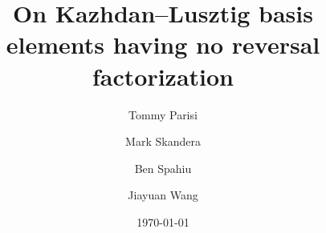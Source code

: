 \documentclass[12pt]{amsart}
\theoremstyle{definition}
\numberwithin{equation}{section}
\newcommand{\wtc}[2]{\widetilde{C}_{#1}}
\newcommand{\msfA}{\mathsf{A}}
\newcommand{\msfBB}{\mathsf{B}}
\newcommand{\msfC}{\mathsf{C}}
\newcommand{\msfBC}{\mathsf{BC}}
\begin{document}
\author{Tommy Parisi}
\author{Mark Skandera}
\author{Ben Spahiu}
\author{Jiayuan Wang}
\title[Kahzdan--Lusztig basis elements having no reversal factorization]
{On Kazhdan--Lusztig basis elements having no reversal factorization}%



\date{\today}

\end{document}
